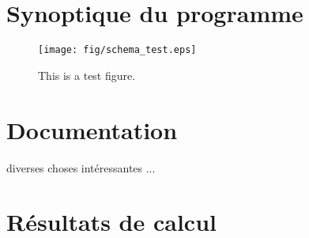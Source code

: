 


\chapter{Synoptique du programme}
\begin{figure}
	\begin{center}
		\texttt{[image: fig/schema\_test.eps]}
		\caption{This is a test figure.}
	\end{center}
\end{figure}


\chapter{Documentation}
diverses choses intéressantes ...



\chapter{Résultats de calcul}